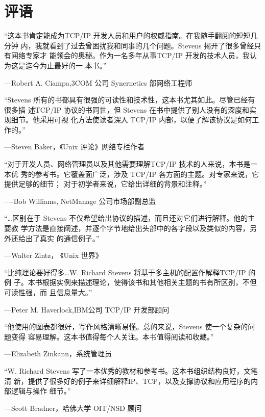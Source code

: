 

\chapter*{评语}
“这本书肯定能成为TCP/IP 开发人员和用户的权威指南。在我随手翻阅的短短几分钟
内，我就看到了过去曾困扰我和同事的几个问题。Stevens 揭开了很多曾经只有网络专家才
能领会的奥秘。作为一名多年从事TCP/IP 开发的技术人员，我认为这是迄今为止最好的一
本书。”
\begin{flushright}
    —Robert A. Ciampa,3COM 公司 Synernetics 部网络工程师
\end{flushright}

“Stevens 所有的书都具有很强的可读性和技术性，这本书尤其如此。尽管已经有很多描
述TCP/IP 协议的书同世，但 Stevens 在书中提供了别人没有的深度和实现细节。他采用可视
化方法使读者深入 TCP/IP 内部，以便了解该协议是如何工作的。”
\begin{flushright}
    —Steven Baker，《Unix 评论》网络专栏作者
\end{flushright}

“对于开发人员、网络管理员以及其他需要理解TCP/IP 技术的人来说，本书是一本优
秀的参考书。它覆盖面广泛，涉及 TCP/IP 各方面的主题。对专家来说，它提供足够的细节；
对于初学者来说，它给出详细的背景和注释。”
\begin{flushright}
    —-Bob Williams, NetManage 公司市场部副总监
\end{flushright}

“\dots 区别在于 Stevens 不仅希望给出协议的描述，而且还对它们进行解释。他的主要教
学方法是直接阐述，并逐个字节地给出头部中的各字段以及类似的内容，另外还给出了真实
的通信例子。”
\begin{flushright}
    —Walter Zintz， 《Unix 世界》
\end{flushright}

“比纯理论要好得多\dots W. Richard Stevens 将基于多主机的配置作解释TCP/IP 的例
子。本书根据实例来描述理论，使得该书和其他相关主题的书有所区别，不但可读性强，而
且信息量大。”
\begin{flushright}
    —Peter M. Haverlock,IBM公司 TCP/IP 开发部顾问
\end{flushright}

“他使用的图表都很好，写作风格清晰易懂。总的来说，Stevens 使一个复杂的问题变得
容易理解。这本书值得每个人关注。本书值得阅读和收藏。”
\begin{flushright}
    —Elizabeth Zinkann，系统管理员
\end{flushright}

“W. Richard Stevens 写了一本优秀的教材和参考书。这本书组织结构良好，文笔清
新，提供了很多好的例子来详细解释IP、TCP，以及支撑协议和应用程序的内部逻辑与操作
细节。”
\begin{flushright}
    —Scott Bradner，哈佛大学 OIT/NSD 顾问
\end{flushright}
